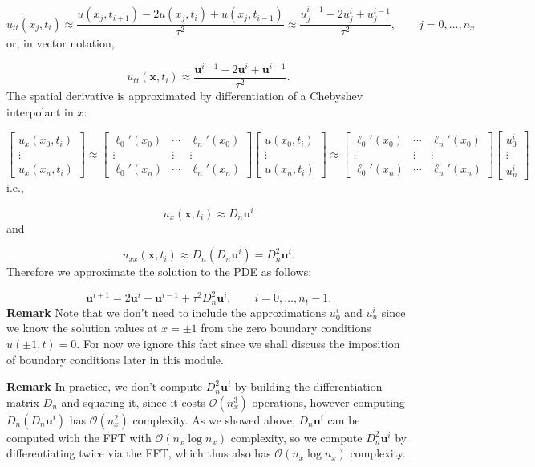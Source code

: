\documentclass[12pt,a4paper]{article}
\begin{document}
\[
u_{tt}(x_j,t_i) \approx \frac{u(x_j,t_{i+1}) - 2u(x_j,t_{i}) + u(x_j,t_{i-1})}{\tau^2} \approx \frac{u^{i+1}_j - 2u^{i}_j + u^{i-1}_j}{\tau^2}, \qquad j = 0, \ldots, n_x
\]
or, in vector notation,

\[
u_{tt}(\mathbf{x},t_i) \approx \frac{\mathbf{u}^{i+1} - 2\mathbf{u}^{i} + \mathbf{u}^{i-1}}{\tau^2}.
\]
The spatial derivative is approximated by differentiation of a Chebyshev interpolant in $x$: 

\[
\begin{bmatrix}
u_x(x_0,t_i) \\
\vdots \\
u_x(x_n,t_i)
\end{bmatrix} \approx 
\begin{bmatrix}
\ell_0'(x_0) & \cdots & \ell_n'(x_0) \\
\vdots & \vdots  & \vdots \\
\ell_0'(x_n) & \cdots & \ell_n'(x_n)
\end{bmatrix}
\begin{bmatrix}
u(x_0,t_i) \\
\vdots \\
u(x_n,t_i) 
\end{bmatrix}
\approx
\begin{bmatrix}
\ell_0'(x_0) & \cdots & \ell_n'(x_0) \\
\vdots & \vdots  & \vdots \\
\ell_0'(x_n) & \cdots & \ell_n'(x_n)
\end{bmatrix}
\begin{bmatrix}
u_0^i \\
\vdots \\
u_n^i
\end{bmatrix}
\]
i.e.,

\[
u_{x}(\mathbf{x},t_i) \approx D_n\mathbf{u}^{i}
\]
and

\[
u_{xx}(\mathbf{x},t_i) \approx D_n\left(D_n\mathbf{u}^{i}\right) = D_n^2\mathbf{u}^{i}.
\]
Therefore we approximate the solution to the PDE as follows:

\[
\mathbf{u}^{i+1} = 2\mathbf{u}^{i} - \mathbf{u}^{i-1} + \tau^2 D_n^2\mathbf{u}^{i}, \qquad i = 0, \ldots, n_t-1.
\]
\textbf{Remark} Note that we don't need to include the approximations $u_0^{i}$ and $u_n^{i}$ since we know the solution values at $x = \pm 1$ from the zero boundary conditions $u(\pm 1, t) = 0$.  For now we ignore this fact since we shall discuss the imposition of boundary conditions later in this module.

\textbf{Remark} In practice, we don't compute $D_n^2\mathbf{u}^{i}$ by building the differentiation matrix $D_n$ and squaring it, since it costs $\mathcal{O}(n_x^3)$ operations, however computing $D_n(D_n\mathbf{u}^{i})$ has $\mathcal{O}(n_x^2)$ complexity. As we showed above, $D_n\mathbf{u}^{i}$ can be computed with the FFT with $\mathcal{O}(n_x\log n_x)$ complexity, so we compute $D_n^2\mathbf{u}^{i}$ by differentiating twice via the FFT, which thus also has $\mathcal{O}(n_x\log n_x)$ complexity.
\end{document}

